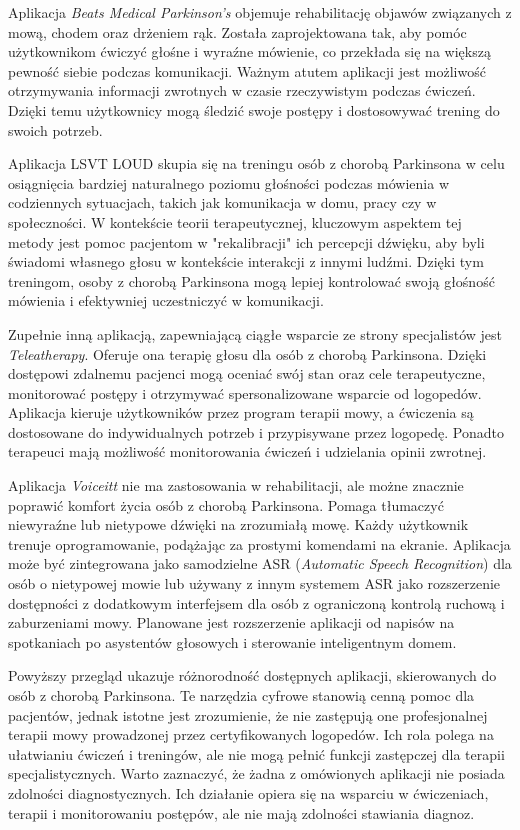 Aplikacja \emph{Beats Medical Parkinson's} objemuje rehabilitację objawów związanych z mową, chodem oraz drżeniem rąk.
Została zaprojektowana tak, aby pomóc użytkownikom ćwiczyć głośne i wyraźne mówienie, co przekłada się na większą pewność siebie podczas komunikacji.
Ważnym atutem aplikacji jest możliwość otrzymywania informacji zwrotnych w czasie rzeczywistym podczas ćwiczeń.
Dzięki temu użytkownicy mogą śledzić swoje postępy i dostosowywać trening do swoich potrzeb.

Aplikacja LSVT LOUD skupia się na treningu osób z chorobą Parkinsona w celu osiągnięcia bardziej naturalnego poziomu głośności podczas mówienia
w codziennych sytuacjach, takich jak komunikacja w domu, pracy czy w społeczności.
W kontekście teorii terapeutycznej, kluczowym aspektem tej metody jest pomoc pacjentom w "rekalibracji" ich percepcji dźwięku, aby byli świadomi
własnego głosu w kontekście interakcji z innymi ludźmi.
Dzięki tym treningom, osoby z chorobą Parkinsona mogą lepiej kontrolować swoją głośność mówienia i efektywniej uczestniczyć w komunikacji.

Zupełnie inną aplikacją, zapewniającą ciągłe wsparcie ze strony specjalistów jest \emph{Teleatherapy}.
Oferuje ona terapię głosu dla osób z chorobą Parkinsona.
Dzięki dostępowi zdalnemu pacjenci mogą oceniać swój stan oraz cele terapeutyczne, monitorować postępy i otrzymywać spersonalizowane wsparcie od logopedów.
Aplikacja kieruje użytkowników przez program terapii mowy, a ćwiczenia są dostosowane do indywidualnych potrzeb i przypisywane przez logopedę.
Ponadto terapeuci mają możliwość monitorowania ćwiczeń i udzielania opinii zwrotnej.

Aplikacja \emph{Voiceitt} nie ma zastosowania w rehabilitacji, ale możne znacznie poprawić komfort życia osób z chorobą Parkinsona.
Pomaga tłumaczyć niewyraźne lub nietypowe dźwięki na zrozumiałą mowę.
Każdy użytkownik trenuje oprogramowanie, podążając za prostymi komendami na ekranie.
Aplikacja może być zintegrowana jako samodzielne ASR (\emph{Automatic Speech Recognition}) dla osób o nietypowej mowie lub używany z innym systemem ASR
jako rozszerzenie dostępności z dodatkowym interfejsem dla osób z ograniczoną kontrolą ruchową i zaburzeniami mowy.
Planowane jest rozszerzenie aplikacji od napisów na spotkaniach po asystentów głosowych i sterowanie inteligentnym domem.

Powyższy przegląd ukazuje różnorodność dostępnych aplikacji, skierowanych do osób z chorobą Parkinsona.
Te narzędzia cyfrowe stanowią cenną pomoc dla pacjentów, jednak istotne jest zrozumienie, że nie zastępują one profesjonalnej terapii mowy prowadzonej
przez certyfikowanych logopedów.
Ich rola polega na ułatwianiu ćwiczeń i treningów, ale nie mogą pełnić funkcji zastępczej dla terapii specjalistycznych.
Warto zaznaczyć, że żadna z omówionych aplikacji nie posiada zdolności diagnostycznych.
Ich działanie opiera się na wsparciu w ćwiczeniach, terapii i monitorowaniu postępów, ale nie mają zdolności stawiania diagnoz.

